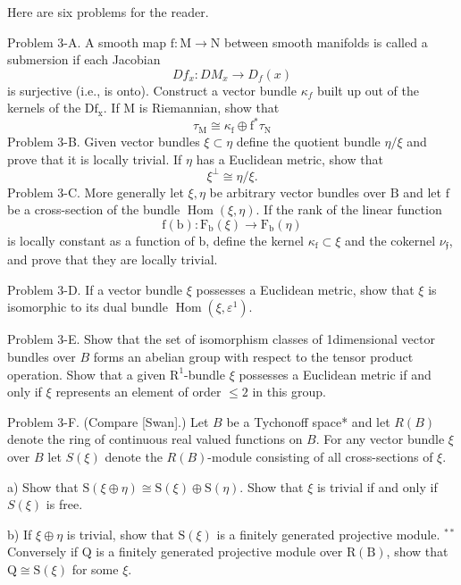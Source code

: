 \documentclass[10pt]{article}
\begin{document}
Here are six problems for the reader.

Problem 3-A. A smooth map $\mathrm{f}: \mathrm{M} \rightarrow \mathrm{N}$ between smooth manifolds is called a submersion if each Jacobian
$$
D f_{x}: D M_{x} \rightarrow D_{f}(x)
$$
is surjective (i.e., is onto). Construct a vector bundle $\kappa_{f}$ built up out of the kernels of the $\mathrm{Df}_{\mathrm{x}}$. If $\mathrm{M}$ is Riemannian, show that
$$
\tau_{\mathrm{M}} \cong \kappa_{\mathrm{f}} \oplus \mathrm{f}^{*} \tau_{\mathrm{N}}
$$
Problem 3-B. Given vector bundles $\xi \subset \eta$ define the quotient bundle $\eta / \xi$ and prove that it is locally trivial. If $\eta$ has a Euclidean metric, show that
$$
\xi^{\perp} \cong \eta / \xi .
$$
Problem 3-C. More generally let $\xi, \eta$ be arbitrary vector bundles over $\mathrm{B}$ and let $\mathrm{f}$ be a cross-section of the bundle $\operatorname{Hom}(\xi, \eta)$. If the rank of the linear function
$$
\mathrm{f}(\mathrm{b}): \mathrm{F}_{\mathrm{b}}(\xi) \rightarrow \mathrm{F}_{\mathrm{b}}(\eta)
$$
is locally constant as a function of $\mathrm{b}$, define the kernel $\kappa_{\mathrm{f}} \subset \xi$ and the cokernel $\nu_{\mathfrak{f}}$, and prove that they are locally trivial.

Problem 3-D. If a vector bundle $\xi$ possesses a Euclidean metric, show that $\xi$ is isomorphic to its dual bundle $\operatorname{Hom}\left(\xi, \varepsilon^{1}\right)$.

Problem 3-E. Show that the set of isomorphism classes of 1dimensional vector bundles over $B$ forms an abelian group with respect to the tensor product operation. Show that a given $\mathrm{R}^{1}$-bundle $\xi$ possesses a Euclidean metric if and only if $\xi$ represents an element of order $\leq 2$ in this group.

Problem 3-F. (Compare [Swan].) Let $B$ be a Tychonoff space* and let $R(B)$ denote the ring of continuous real valued functions on $B$. For any vector bundle $\xi$ over $B$ let $S(\xi)$ denote the $R(B)$-module consisting of all cross-sections of $\xi$.

a) Show that $\mathrm{S}(\xi \oplus \eta) \cong \mathrm{S}(\xi) \oplus \mathrm{S}(\eta)$. Show that $\xi$ is trivial if and only if $S(\xi)$ is free.

b) If $\xi \oplus \eta$ is trivial, show that $\mathrm{S}(\xi)$ is a finitely generated projective module. ${ }^{* *}$ Conversely if $\mathrm{Q}$ is a finitely generated projective module over $\mathrm{R}(\mathrm{B})$, show that $\mathrm{Q} \cong \mathrm{S}(\xi)$ for some $\xi$.
\end{document}
